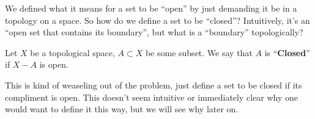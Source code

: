 
\begin{prob}
We defined what it means for a set to be ``open'' by just demanding it
be in a topology on a space. So how do we define a set to be
``closed''? Intuitively, it's an ``open set that contains its
boundary'', but what is a ``boundary'' topologically?
\end{prob}

\begin{defn}
Let $X$ be a topological space, $A\subset X$ be some subset. We say
that $A$ is ``\textbf{Closed}'' if $X-A$ is open.
\end{defn}
\begin{rmk}
This is kind of weaseling out of the problem, just define a set to be
closed if its compliment is open. This doesn't seem intuitive or
immediately clear why one would want to define it this way, but we
will see why later on.
\end{rmk}

